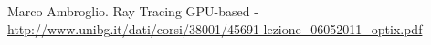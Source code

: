 \begin{thebibliography}{10}
\fancyfoot[C]{\thepage } 
Marco Ambroglio. Ray Tracing GPU-based - \url{http://www.unibg.it/dati/corsi/38001/45691-lezione_06052011_optix.pdf}
\end{thebibliography}

